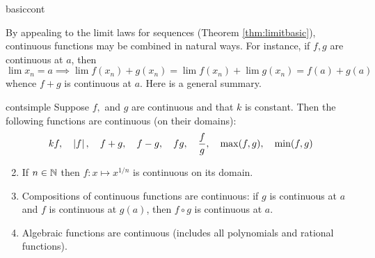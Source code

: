 \begin{examples}{}{basiccont}
\begin{enumerate}
	\end{enumerate}
\end{examples}



By appealing to the limit laws for sequences (Theorem \ref{thm:limitbasic}), continuous functions may be combined in natural ways. For instance, if $f,g$ are continuous at $a$, then
\[
	\lim x_n=a\implies 
	\lim f(x_n)+g(x_n) =\lim f(x_n)+\lim g(x_n) =f(a)+g(a)
\]
whence $f+g$ is continuous at $a$. Here is a general summary.

\begin{thm}{}{contsimple}
	\exstart Suppose $f,$ and $g$ are continuous and that $k$ is constant. Then the following functions are continuous (on their domains):
	\[
		kf,\quad \left| f\right|,\quad f+g,\quad f-g,\quad fg,\quad \frac fg,\quad \max(f,g),\quad \min(f,g)
	\]
	\begin{enumerate}\setcounter{enumi}{1}
		\item If $n\in\mathbb{N}$ then $f:x\mapsto x^{1/n}$ is continuous on its domain.
		\item Compositions of continuous functions are continuous: if $g$ is continuous at $a$ and $f$ is continuous at $g(a)$, then $f\circ g$ is continuous at $a$.
		\item Algebraic functions are continuous (includes all polynomials and rational functions).
	\end{enumerate}
\end{thm}

